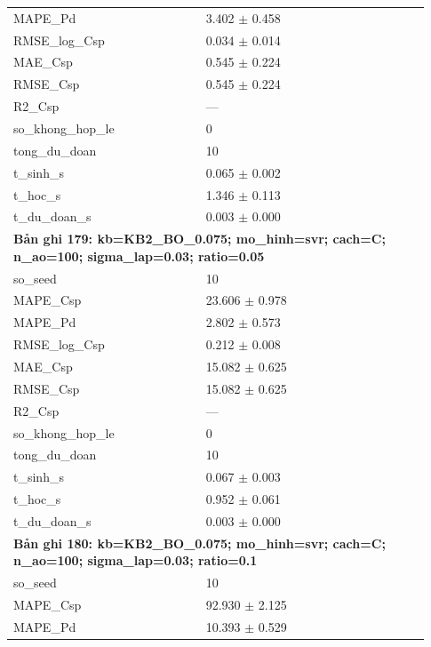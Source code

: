 \begin{longtable}{p{0.43\linewidth}p{0.50\linewidth}}
MAPE\_\allowbreak Pd & 3.402 $\pm$ 0.458 \\
RMSE\_\allowbreak log\_\allowbreak Csp & 0.034 $\pm$ 0.014 \\
MAE\_\allowbreak Csp & 0.545 $\pm$ 0.224 \\
RMSE\_\allowbreak Csp & 0.545 $\pm$ 0.224 \\
R2\_\allowbreak Csp & — \\
so\_\allowbreak khong\_\allowbreak hop\_\allowbreak le & 0 \\
tong\_\allowbreak du\_\allowbreak doan & 10 \\
t\_\allowbreak sinh\_\allowbreak s & 0.065 $\pm$ 0.002 \\
t\_\allowbreak hoc\_\allowbreak s & 1.346 $\pm$ 0.113 \\
t\_\allowbreak du\_\allowbreak doan\_\allowbreak s & 0.003 $\pm$ 0.000 \\
\midrule
\multicolumn{2}{p{0.95\linewidth}}{\textbf{Bản ghi 179: kb=KB2\_BO\_0.075; mo\_hinh=svr; cach=C; n\_ao=100; sigma\_lap=0.03; ratio=0.05}} \\
so\_\allowbreak seed & 10 \\
MAPE\_\allowbreak Csp & 23.606 $\pm$ 0.978 \\
MAPE\_\allowbreak Pd & 2.802 $\pm$ 0.573 \\
RMSE\_\allowbreak log\_\allowbreak Csp & 0.212 $\pm$ 0.008 \\
MAE\_\allowbreak Csp & 15.082 $\pm$ 0.625 \\
RMSE\_\allowbreak Csp & 15.082 $\pm$ 0.625 \\
R2\_\allowbreak Csp & — \\
so\_\allowbreak khong\_\allowbreak hop\_\allowbreak le & 0 \\
tong\_\allowbreak du\_\allowbreak doan & 10 \\
t\_\allowbreak sinh\_\allowbreak s & 0.067 $\pm$ 0.003 \\
t\_\allowbreak hoc\_\allowbreak s & 0.952 $\pm$ 0.061 \\
t\_\allowbreak du\_\allowbreak doan\_\allowbreak s & 0.003 $\pm$ 0.000 \\
\midrule
\multicolumn{2}{p{0.95\linewidth}}{\textbf{Bản ghi 180: kb=KB2\_BO\_0.075; mo\_hinh=svr; cach=C; n\_ao=100; sigma\_lap=0.03; ratio=0.1}} \\
so\_\allowbreak seed & 10 \\
MAPE\_\allowbreak Csp & 92.930 $\pm$ 2.125 \\
MAPE\_\allowbreak Pd & 10.393 $\pm$ 0.529 \\

\end{longtable}

